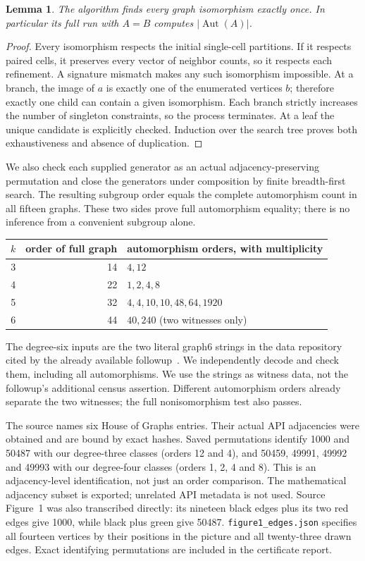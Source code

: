 \documentclass[11pt,a4paper]{article}
\newtheorem{lemma}[proposition]{Lemma}
\newcommand{\Aut}{\operatorname{Aut}}
\begin{document}
\begin{lemma}
The algorithm finds every graph isomorphism exactly once. In particular its
full run with $A=B$ computes $|\Aut(A)|$.
\end{lemma}
\begin{proof}
Every isomorphism respects the initial single-cell partitions. If it respects
paired cells, it preserves every vector of neighbor counts, so it respects
each refinement. A signature mismatch makes any such isomorphism impossible.
At a branch, the image of $a$ is exactly one of the enumerated vertices $b$;
therefore exactly one child can contain a given isomorphism. Each branch
strictly increases the number of singleton constraints, so the process
terminates. At a leaf the unique candidate is explicitly checked. Induction
over the search tree proves both exhaustiveness and absence of duplication.
\end{proof}
We also check each supplied generator as an actual adjacency-preserving
permutation and close the generators under composition by finite breadth-first
search. The resulting subgroup order equals the complete automorphism count
in all fifteen graphs. These two sides prove full automorphism equality;
there is no inference from a convenient subgroup alone.

\begin{center}
\begin{tabular}{rrl}
\toprule
$k$&order of full graph&automorphism orders, with multiplicity\\
\midrule
3&14&$4,12$\\
4&22&$1,2,4,8$\\
5&32&$4,4,10,10,48,64,1920$\\
6&44&$40,240$ (two witnesses only)\\
\bottomrule
\end{tabular}
\end{center}
The degree-six inputs are the two literal graph6 strings in the data repository
cited by the already available followup~\cite{data}. We independently decode
and check them, including all automorphisms. We use the strings as witness
data, not the followup's additional census assertion. Different automorphism
orders already separate the two witnesses; the full nonisomorphism test also
passes.

The source names six House of Graphs entries. Their actual API adjacencies
were obtained and are bound by exact hashes. Saved permutations identify
1000 and 50487 with our degree-three classes (orders 12 and 4), and 50459,
49991, 49992 and 49993 with our degree-four classes (orders 1, 2, 4 and 8).
This is an adjacency-level identification, not just an order comparison.
The mathematical adjacency subset is exported; unrelated API metadata is
not used. Source Figure~1 was also transcribed directly: its nineteen black
edges plus its two red edges give 1000, while black plus green give 50487.
\texttt{figure1\_edges.json} specifies all fourteen vertices by their positions
in the picture and all twenty-three drawn edges. Exact identifying
permutations are included in the certificate report.
\end{document}
